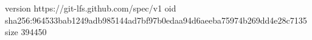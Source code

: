 version https://git-lfs.github.com/spec/v1
oid sha256:964533bab1249adb985144ad7bf97b0edaa94d6aeeba75974b269dd4e28c7135
size 394450
